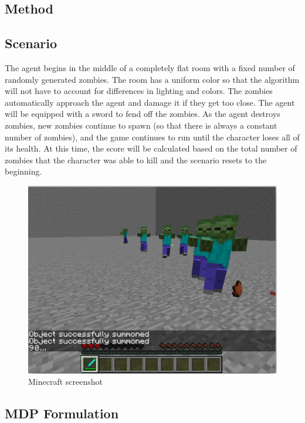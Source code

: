 \documentclass{article}
\begin{document}
\begin{multicols}{2}
\section{Method}



\subsection{Scenario}

The agent begins in the middle of a completely flat room with a fixed number of randomly generated zombies. The room has a uniform color so that the algorithm will not have to account for differences in lighting and colors. The zombies automatically approach the agent and damage it if they get too close. The agent will be equipped with a sword to fend off the zombies. As the agent destroys zombies, new zombies continue to spawn (so that there is always a constant number of zombies), and the game continues to run until the character loses all of its health. At this time, the score will be calculated based on the total number of zombies that the character was able to kill and the scenario resets to the beginning.

\begin{figure}[H]
\caption{Minecraft screenshot}
\centering
\includegraphics[scale=0.3]{./hiro_screenshot.png}
\end{figure}

\subsection{MDP Formulation}


\end{multicols}
\end{document}
